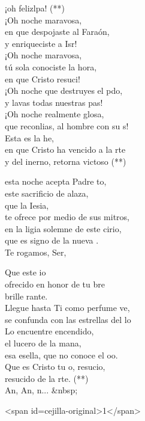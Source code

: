 \begin{cancion}
\begin{chorus}
		¡oh felizlpa! (**)\\
		¡Oh noche maravosa,\\
	\jump
	en que despojaste al Faraón,\\
		y enriqueciste a Isr!\\
		¡Oh noche maravosa,\\
	\jump
	tú sola conociste la hora,\\
		en que Cristo resuci!\\
		¡Oh noche que destruyes el pdo,\\
		y lavas todas nuestras pas!\\
		¡Oh noche realmente glosa,\\
		que reconlias, al hombre con su s!\\
	\jump
		Esta es la he,\\
		en que Cristo ha vencido a la rte\\
		y del inerno, retorna victoso (**)\jump\\
	\end{chorus}%
	esta noche acepta Padre to,\\
	este sacrificio de alaza,\\
	que la Iesia,\\
	te ofrece por medio de sus mitros,\\
	en la ligia solemne de este cirio,\\
	que es signo de la nueva .\\
	\jump
	Te rogamos, Ser,\jump\\
	\begin{chorus}%
		Que este io\\
		ofrecido en honor de tu bre\\
		brille rante.\\
		Llegue hasta Ti como perfume ve,\\
		se confunda con las estrellas del lo\\
	\jump
	Lo encuentre encendido,\\
		el lucero de la mana,\\
		esa esella, que no conoce el oo.\\
	\jump
		Que es Cristo tu o, resucio,\\
		resucido de la rte. (**)\\
		An, An, n... &nbsp; \jump\\
	\end{chorus}%
<span id=cejilla-original>1</span>\\
\end{cancion}%
